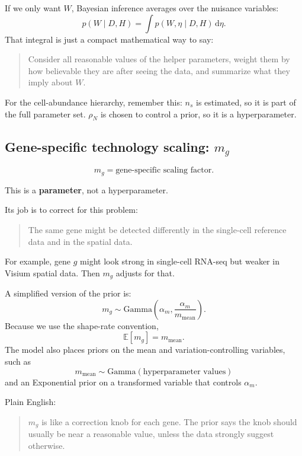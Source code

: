 \documentclass[11pt]{article}
\newcommand{\dd}{\mathrm{d}}
\newcommand{\E}{\mathbb{E}}
\newcommand{\term}[1]{\textbf{#1}}
\begin{document}
If we only want $W$, Bayesian inference averages over the nuisance variables:
\[
p(W\mid D,H)=\int p(W,\eta\mid D,H)\,\dd\eta.
\]
That integral is just a compact mathematical way to say:

\begin{quote}
Consider all reasonable values of the helper parameters, weight them by how believable they are after seeing the data, and summarize what they imply about $W$.
\end{quote}

\begin{checkpoint}
For the cell-abundance hierarchy, remember this: $n_s$ is estimated, so it is part of the full parameter set. $\rho_N$ is chosen to control a prior, so it is a hyperparameter.
\end{checkpoint}

\subsection{Gene-specific technology scaling: $m_g$}

\[
m_g=\text{gene-specific scaling factor}.
\]

This is a \term{parameter}, not a hyperparameter.

Its job is to correct for this problem:

\begin{quote}
The same gene might be detected differently in the single-cell reference data and in the spatial data.
\end{quote}

For example, gene $g$ might look strong in single-cell RNA-seq but weaker in Visium spatial data. Then $m_g$ adjusts for that.

A simplified version of the prior is:
\[
m_g\sim \mathrm{Gamma}\left(\alpha_m,\frac{\alpha_m}{m_{\mathrm{mean}}}\right).
\]
Because we use the shape-rate convention,
\[
\E[m_g]=m_{\mathrm{mean}}.
\]
The model also places priors on the mean and variation-controlling variables, such as
\[
m_{\mathrm{mean}}\sim \mathrm{Gamma}(\text{hyperparameter values})
\]
and an Exponential prior on a transformed variable that controls $\alpha_m$.

Plain English:

\begin{quote}
$m_g$ is like a correction knob for each gene. The prior says the knob should usually be near a reasonable value, unless the data strongly suggest otherwise.
\end{quote}
\end{document}
